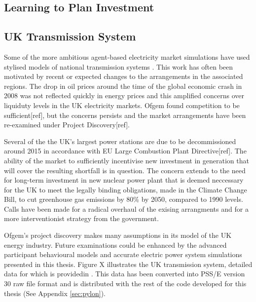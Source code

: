 \subsection{Learning to Plan Investment}

\subsection{UK Transmission System}
Some of the more ambitious agent-based electricity market simulations have used
stylised models of national transmission systems
\cite{cincotti:09,weidlich:06}.  This work has often been motivated by recent
or expected changes to the arrangements in the associated regions.  The drop in
oil prices around the time of the global economic crash in 2008 was not
reflected quickly in energy prices and this amplified concerns over liquiduty
levels in the UK electricity markets.  Ofgem found competition to be
sufficient[ref], but the concerns persists and the market arrangements have
been re-examined under Project Discovery[ref].

Several of the the UK's largest power stations are due to be decommissioned
around 2015 in accordance with EU Large Combustion Plant Directive[ref].  The
ability of the market to sufficiently incentivise new investment in generation that will cover the
resulting shortfall is in question.  The concern extends to the need for
long-term investment in new nuclear power plant that is deemed neccessary for
the UK to meet the legally binding obligations, made in the Climate Change
Bill, to cut greenhouse gas emissions by 80\% by 2050, compared to 1990 levels.
Calls have been made for a radical overhaul of the exising arrangments and for
a more interventionist strategy from the government.

Ofgem's project discovery makes many assumptions in its model of the UK
energy industry.  Future examinations could be enhanced by the advanced
participant behavioural models and accurate electric power system simulations
presented in this thesis.  Figure X illustrates the UK transmission system,
detailed data for which is providedin .  This data has been
converted into PSS/E version 30 raw file format and is distributed with the
rest of the code developed for this thesis (See Appendix \ref{sec:pylon}).

